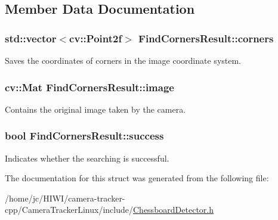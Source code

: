\subsection{Member Data Documentation}
\subsubsection[{\texorpdfstring{corners}{corners}}]{\setlength{\rightskip}{0pt plus 5cm}std\+::vector$<$cv\+::\+Point2f$>$ Find\+Corners\+Result\+::corners}\hypertarget{struct_find_corners_result_a138337b67fb9eb6010ec7c9a276a009f}{}\label{struct_find_corners_result_a138337b67fb9eb6010ec7c9a276a009f}
Saves the coordinates of corners in the image coordinate system. 
\subsubsection[{\texorpdfstring{image}{image}}]{\setlength{\rightskip}{0pt plus 5cm}cv\+::\+Mat Find\+Corners\+Result\+::image}\hypertarget{struct_find_corners_result_a8c2fd90c9f86bed108eb777fd237f113}{}\label{struct_find_corners_result_a8c2fd90c9f86bed108eb777fd237f113}
Contains the original image taken by the camera. 
\subsubsection[{\texorpdfstring{success}{success}}]{\setlength{\rightskip}{0pt plus 5cm}bool Find\+Corners\+Result\+::success}\hypertarget{struct_find_corners_result_a53a6b5d4fc0243582800d92b2bc5e706}{}\label{struct_find_corners_result_a53a6b5d4fc0243582800d92b2bc5e706}
Indicates whether the searching is successful. 

The documentation for this struct was generated from the following file\+:\begin{DoxyCompactItemize}
\item 
/home/jc/\+H\+I\+W\+I/camera-\/tracker-\/cpp/\+Camera\+Tracker\+Linux/include/\hyperlink{_chessboard_detector_8h}{Chessboard\+Detector.\+h}\end{DoxyCompactItemize}
